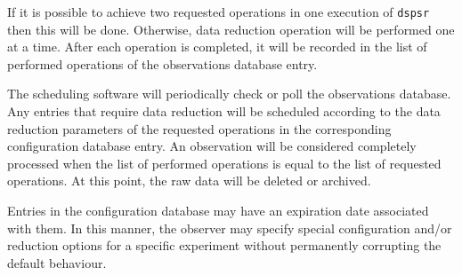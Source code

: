 If it is possible to achieve two requested operations in one execution
of {\tt dspsr} then this will be done.  Otherwise, data reduction
operation will be performed one at a time.  After each operation is
completed, it will be recorded in the list of performed operations of
the observations database entry.

The scheduling software will periodically check or poll the
observations database.  Any entries that require data reduction will
be scheduled according to the data reduction parameters of the
requested operations in the corresponding configuration database
entry.  An observation will be considered completely processed when
the list of performed operations is equal to the list of requested
operations.  At this point, the raw data will be deleted or archived.

Entries in the configuration database may have an expiration date
associated with them.  In this manner, the observer may specify
special configuration and/or reduction options for a specific
experiment without permanently corrupting the default behaviour.

